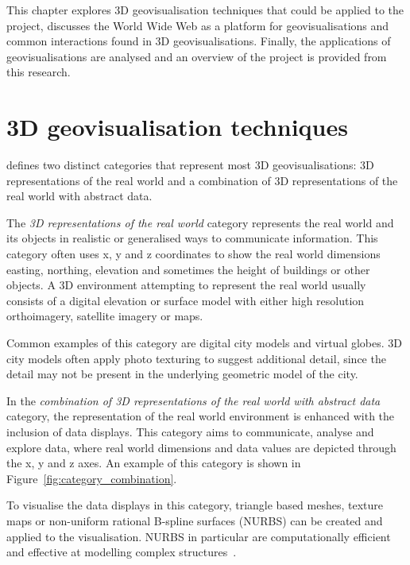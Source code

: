 
This chapter explores 3D geovisualisation techniques that could be applied to the project, discusses the World Wide Web as a platform for geovisualisations and common interactions found in 3D geovisualisations. Finally, the applications of geovisualisations are analysed and an overview of the project is provided from this research.

\section{3D geovisualisation techniques} {

	\textcite{bleisch2012geovisualization} defines two distinct categories that represent most 3D geovisualisations: 3D representations of the real world and a combination of 3D representations of the real world with abstract data.

	The \emph{3D representations of the real world} category represents the real world and its objects in realistic or generalised ways to communicate information. This category often uses x, y and z coordinates to show the real world dimensions \textendash\, easting, northing, elevation and sometimes the height of buildings or other objects. A 3D environment attempting to represent the real world usually consists of a digital elevation or surface model with either high resolution orthoimagery, satellite imagery or maps.

	

	Common examples of this category are digital city models and virtual globes. 3D city models often apply photo texturing to suggest additional detail, since the detail may not be present in the underlying geometric model of the city.

	In the \emph{combination of 3D representations of the real world with abstract data} category, the representation of the real world environment is enhanced with the inclusion of data displays. This category aims to communicate, analyse and explore data, where real world dimensions and data values are depicted through the x, y and z axes. An example of this category is shown in Figure~\ref{fig:category_combination}.

	To visualise the data displays in this category, triangle based meshes, texture maps or non-uniform rational B-spline surfaces (NURBS) can be created and applied to the visualisation. NURBS in particular are computationally efficient and effective at modelling complex structures~\parencite{hildebrandt2011image, zhong2006enhanced}.

}

